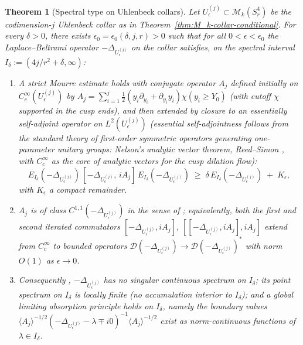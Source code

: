 \documentclass[11pt,letterpaper]{article}
\newtheorem{theorem}{Theorem}[section]
\theoremstyle{definition}
\newcommand{\cM}{\mathcal{M}}
\newcommand{\Lap}{\Delta}
\begin{document}
\begin{theorem}[Spectral type on Uhlenbeck collars]\label{thm:M_k-collar-spectral-type}
Let $U_\epsilon^{(j)} \subset \cM_k(S^4_r)$ be the codimension-$j$ Uhlenbeck collar as in Theorem~\ref{thm:M_k-collar-conditional}. For every $\delta > 0$, there exists $\epsilon_0 = \epsilon_0(\delta, j, r) > 0$ such that for all $0 < \epsilon < \epsilon_0$ the Laplace--Beltrami operator $-\Lap_{U_\epsilon^{(j)}}$ on the collar satisfies, on the spectral interval $I_\delta := (4j/r^2 + \delta, \infty)$:
\begin{enumerate}\setlength{\itemsep}{2pt}
\item[\textup{(i)}] A strict Mourre estimate holds with conjugate operator $A_j$ defined initially on $C_c^\infty(U_\epsilon^{(j)})$ by $A_j = \sum_{i=1}^j \tfrac12(y_i\partial_{y_i} + \partial_{y_i} y_i)\chi(y_i \ge Y_0)$ (with cutoff $\chi$ supported in the cusp ends), and then extended by closure to an essentially self-adjoint operator on $L^2(U_\epsilon^{(j)})$ (essential self-adjointness follows from the standard theory of first-order symmetric operators generating one-parameter unitary groups: Nelson's analytic vector theorem, Reed--Simon \cite[Thm.~X.39]{ReedSimonII}, with $C_c^\infty$ as the core of analytic vectors for the cusp dilation flow):
\[
E_{I_\delta}(-\Lap_{U_\epsilon^{(j)}})\,[-\Lap_{U_\epsilon^{(j)}},\,iA_j]\,E_{I_\delta}(-\Lap_{U_\epsilon^{(j)}})\;\ge\;\delta\,E_{I_\delta}(-\Lap_{U_\epsilon^{(j)}})\;+\;K_\epsilon,
\]
with $K_\epsilon$ a compact remainder.
\item[\textup{(ii)}] $A_j$ is of class $C^{1,1}(-\Lap_{U_\epsilon^{(j)}})$ in the sense of \cite[Def.~6.2.2]{ABMG1996}; equivalently, both the first and second iterated commutators $[-\Lap_{U_\epsilon^{(j)}}, iA_j]$, $[[-\Lap_{U_\epsilon^{(j)}}, iA_j], iA_j]$ extend from $C_c^\infty$ to bounded operators $\mathcal{D}(-\Lap_{U_\epsilon^{(j)}})\to \mathcal{D}(-\Lap_{U_\epsilon^{(j)}})^*$ with norm $O(1)$ as $\epsilon\to 0$.
\item[\textup{(iii)}] Consequently \cite[Thm.~0.1]{Sahbani1997}, $-\Lap_{U_\epsilon^{(j)}}$ has no singular continuous spectrum on $I_\delta$; its point spectrum on $I_\delta$ is locally finite (no accumulation interior to $I_\delta$); and a global limiting absorption principle holds on $I_\delta$, namely the boundary values $\langle A_j\rangle^{-1/2}(-\Lap_{U_\epsilon^{(j)}} - \lambda \mp i0)^{-1}\langle A_j\rangle^{-1/2}$ exist as norm-continuous functions of $\lambda \in I_\delta$.
\end{enumerate}
\end{theorem}
\end{document}
